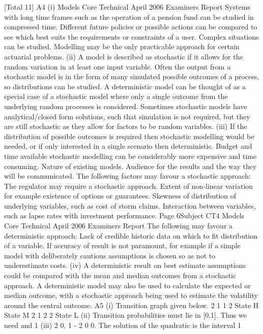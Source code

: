 \documentclass[a4paper,12pt]{article}
\begin{document}
\begin{enumerate}
{[Total 11]
A4
(i)
Models Core Technical
April 2006
Examiners Report
Systems with long time frames such as the operation of a pension fund can be
studied in compressed time.
Different future policies or possible actions can be compared to see which best
suits the requirements or constraints of a user.
Complex situations can be studied.
Modelling may be the only practicable approach for certain actuarial
problems.
(ii)
A model is described as stochastic if it allows for the random variation in at
least one input variable.
Often the output from a stochastic model is in the form of many simulated
possible outcomes of a process, so distributions can be studied.
A deterministic model can be thought of as a special case of a stochastic
model where only a single outcome from the underlying random processes is
considered.
Sometimes stochastic models have analytical/closed form solutions, such that
simulation is not required, but they are still stochastic as they allow for factors
to be random variables.
(iii)
If the distribution of possible outcomes is required then stochastic
modelling would be needed, or if only interested in a single scenario then
deterministic.
Budget and time available
stochastic modelling can be considerably
more expensive and time consuming.
Nature of existing models.
Audience for the results and the way they will be communicated.
The following factors may favour a stochastic approach:
The regulator may require a stochastic approach.
Extent of non-linear variation
for example existence of options or
guarantees.
Skewness of distribution of underlying variables, such as cost of storm
claims.
Interaction between variables, such as lapse rates with investment
performance.
Page 6Subject CT4
Models Core Technical
April 2006
Examiners Report
The following may favour a deterministic approach:
Lack of credible historic data on which to fit distribution of a variable.
If accuracy of result is not paramount, for example if a simple model with
deliberately cautious assumptions is chosen so as not to underestimate
costs.
(iv)
A deterministic result on best estimate assumptions could be compared with
the mean and median outcomes from a stochastic approach.
A deterministic model may also be used to calculate the expected or median
outcome, with a stochastic approach being used to estimate the volatility
around the central outcome.
A5
(i)
Transition graph given below.
2
1
1 2
State H
State M
2
1
2
2
State L
(ii)
Transition probabilities must lie in [0,1]. Thus we need
and 1
(iii)
2
0, 1 - 2
0
0.
The solution of the quadratic is the interval 1
}
\end{enumerate}
\end{document}
